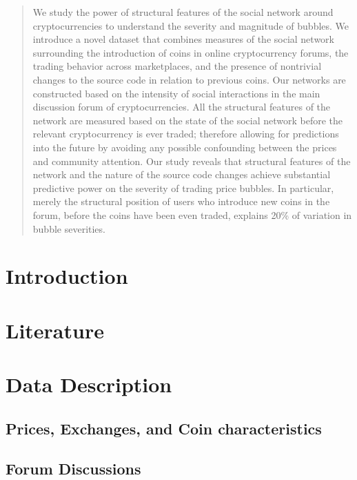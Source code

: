 \documentclass[letterpaper]{article}
\begin{document}
\begin{abstract}

We study the power of structural features of the social network around cryptocurrencies to understand the severity and magnitude of bubbles. 
We introduce a novel dataset that combines measures of the social network surrounding the introduction of coins in online cryptocurrency forums, the trading  behavior across marketplaces, and the presence of nontrivial changes to the source code in relation to previous coins.
Our networks are constructed based on the intensity of social interactions in the main discussion forum of cryptocurrencies. All the structural features of the network are measured based on the state of the social network before the relevant cryptocurrency is ever traded; therefore allowing for predictions into the future by avoiding any possible confounding between the prices and community attention.
Our study reveals that structural features of the network and the nature of the source code changes achieve substantial predictive power on the severity of trading price bubbles. In particular, merely the structural position of users who introduce new coins in the forum, before the coins have been even traded,  explains  20\% of variation in bubble severities.

\end{abstract}

\section{Introduction}

\section{Literature}


\section{Data Description}
\subsection{Prices, Exchanges, and Coin characteristics} \label{data_nikete}



\subsection{Forum Discussions}

\end{document}
